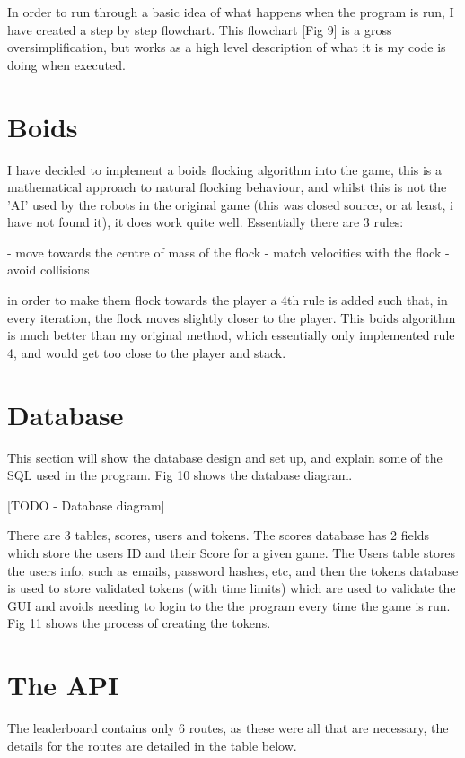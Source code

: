 \documentclass[a4paper, 11pt]{report}
\begin{document}
In order to run through a basic idea of what happens when the program is run, I have created a step by step flowchart. This flowchart [Fig 9] is a gross oversimplification, but works as a high level description of what it is my code is doing when executed.

\section{Boids}
I have decided to implement a boids flocking algorithm into the game, this is a mathematical approach to natural flocking behaviour, and whilst this is not the 'AI' used by the robots in the original game (this was closed source, or at least, i have not found it), it does work quite well. Essentially there are 3 rules:

    - move towards the centre of mass of the flock
    - match velocities with the flock
    - avoid collisions
    
in order to make them flock towards the player a 4th rule is added such that, in every iteration, the flock moves slightly closer to the player. This boids algorithm is much better than my original method, which essentially only implemented rule 4, and would get too close to the player and stack.



\section{Database}
This section will show the database design and set up, and explain some of the SQL used in the program. Fig 10 shows the database diagram.


[TODO - Database diagram]


There are 3 tables, scores, users and tokens. The scores database has 2 fields which store the users ID and their Score for a given game. The Users table stores the users info, such as emails, password hashes, etc, and then the tokens database is used to store validated tokens (with time limits) which are used to validate the GUI and avoids needing to login to the the program every time the game is run. Fig 11 shows the process of creating the tokens.

\section{The API}
The leaderboard contains only 6 routes, as these were all that are necessary, the details for the routes are detailed in the table below.
\end{document}
